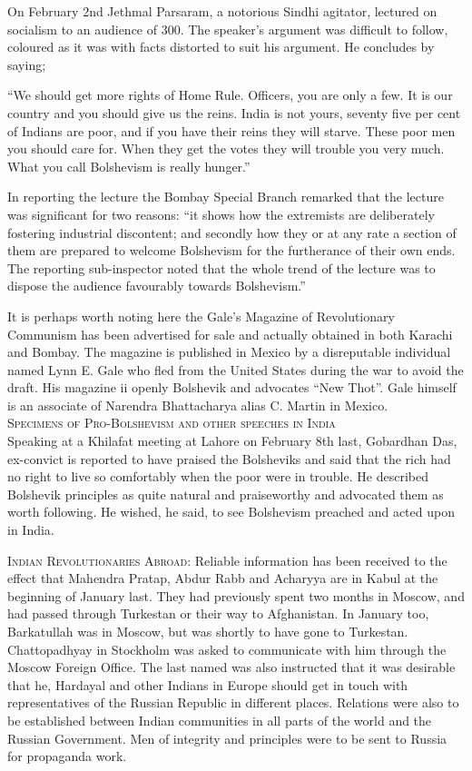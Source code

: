 On February 2nd Jethmal Parsaram, a notorious Sindhi agitator, lectured on socialism to an audience of 300. The speaker’s argument was difficult to follow, coloured as it was with facts distorted to suit his argument. He concludes by saying;

“We should get more rights of Home Rule. Officers, you are only a few. It is our country and you should give us the reins. India is not yours, seventy five per cent of Indians are poor, and if you have their reins they will starve. These poor men you should care for. When they get the votes they will trouble you very much. What you call Bolshevism is really hunger.” 

In reporting the lecture the Bombay Special Branch remarked that the lecture was significant for two reasons: “it shows how the extremists are deliberately fostering industrial discontent; and secondly how they or at any rate a section of them are prepared to welcome Bolshevism for the furtherance of their own ends. The reporting sub-inspector noted that the whole trend of the lecture was to dispose the audience favourably towards Bolshevism.” 

It is perhaps worth noting here the Gale’s Magazine of Revolutionary Communism has been advertised for sale and actually obtained in both Karachi and Bombay. The magazine is published in Mexico by a disreputable individual named Lynn E. Gale who fled from the United States during the war to avoid the draft. His magazine ii openly Bolshevik and advocates “New Thot”. Gale himself is an associate of Narendra Bhattacharya alias C. Martin in Mexico.\\

\textsc{Specimens of Pro-Bolshevism and other speeches in India }\\

Speaking at a Khilafat meeting at Lahore on February 8th last, Gobardhan Das, ex-convict is reported to have praised the Bolsheviks and said that the rich had no right to live so 
comfortably when the poor were in trouble. He described Bolshevik principles as quite natural and praiseworthy and advocated them as worth following. He wished, he said, to see Bolshevism preached and acted upon in India. 

\textsc{Indian Revolutionaries Abroad:} Reliable information has been received to the effect that Mahendra Pratap, Abdur Rabb and Acharyya are in Kabul at the beginning of January last. 
They had previously spent two months in Moscow, and had passed through Turkestan or their way to Afghanistan. In January too, Barkatullah was in Moscow, but was shortly to have gone to Turkestan. Chattopadhyay in Stockholm was asked to communicate with him through the Moscow Foreign Office. The last named was also instructed that it was desirable that he, Hardayal and other Indians in Europe should get in touch with representatives of the Russian Republic in different places. Relations were also to be established between Indian communities in all parts of the world and the Russian Government. Men of integrity and principles were to be sent to Russia for propaganda work. 

